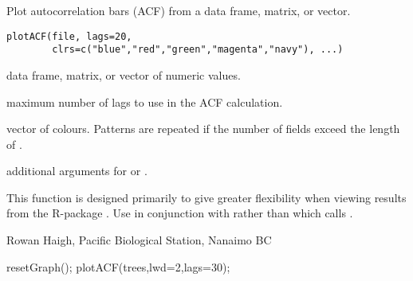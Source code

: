 \documentclass[letterpaper]{book}
\begin{document}
\begin{Description}\relax
Plot autocorrelation bars (ACF) from a data frame, matrix, or vector.
\end{Description}
\begin{Usage}
\begin{verbatim}
plotACF(file, lags=20, 
        clrs=c("blue","red","green","magenta","navy"), ...)
\end{verbatim}
\end{Usage}
\begin{Arguments}
\begin{ldescription}
\item[\code{file}] data frame, matrix, or vector of numeric values.
\item[\code{lags}] maximum number of lags to use in the ACF calculation.
\item[\code{clrs}] vector of colours. Patterns are repeated if the number 
of fields exceed the length of .
\item[\code{...}] additional arguments for  or .
\end{ldescription}
\end{Arguments}
\begin{Details}\relax
This function is designed primarily to give greater flexibility when viewing 
results from the R-package . Use  in conjunction with 
 rather than  
which calls .
\end{Details}
\begin{Author}\relax
Rowan Haigh, Pacific Biological Station, Nanaimo BC
\end{Author}
\begin{Examples}
\begin{ExampleCode}
resetGraph(); plotACF(trees,lwd=2,lags=30);
\end{ExampleCode}
\end{Examples}
\end{document}
